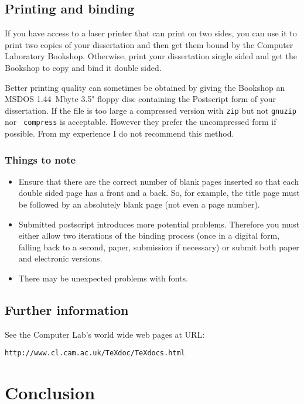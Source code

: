 \documentclass[12pt,twoside,notitlepage]{report}
\begin{document}
\section{Printing and binding}

If you have access to a laser printer that can print on two sides, you
can use it to print two copies of your dissertation and then get them
bound by the Computer Laboratory Bookshop. Otherwise, print your
dissertation single sided and get the Bookshop to copy and bind it double
sided.


Better printing quality can sometimes be obtained by giving the
Bookshop an MSDOS 1.44~Mbyte 3.5" floppy disc containing the
Postscript form of your dissertation. If the file is too large a
compressed version with {\tt zip} but not {\tt gnuzip} nor {\tt
compress} is acceptable. However they prefer the uncompressed form if
possible. From my experience I do not recommend this method.

\subsection{Things to note}

\begin{itemize}
\item Ensure that there are the correct number of blank pages inserted
so that each double sided page has a front and a back.  So, for
example, the title page must be followed by an absolutely blank page
(not even a page number).

\item Submitted postscript introduces more potential problems.
Therefore you must either allow two iterations of the binding process
(once in a digital form, falling back to a second, paper, submission if
necessary) or submit both paper and electronic versions.

\item There may be unexpected problems with fonts.

\end{itemize}

\section{Further information}

See the Computer Lab's world wide web pages at URL:

{\tt http://www.cl.cam.ac.uk/TeXdoc/TeXdocs.html}


\cleardoublepage
\chapter{Conclusion}
\end{document}
